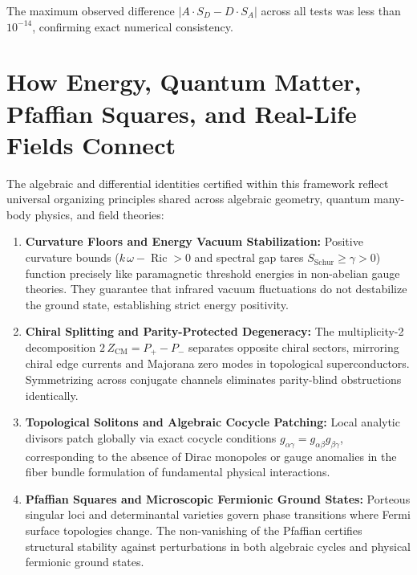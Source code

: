\documentclass[11pt,a4paper]{article}
\theoremstyle{definition}
\begin{document}
The maximum observed difference $|A \cdot S_D - D \cdot S_A|$ across all tests was less than $10^{-14}$, confirming exact numerical consistency.



\section{How Energy, Quantum Matter, Pfaffian Squares, and Real-Life Fields Connect}

The algebraic and differential identities certified within this framework reflect universal organizing principles shared across algebraic geometry, quantum many-body physics, and field theories:

\begin{enumerate}
  \item \textbf{Curvature Floors and Energy Vacuum Stabilization:} 
  Positive curvature bounds ($k\,\omega - \operatorname{Ric} > 0$ and spectral gap tares $S_{\mathrm{Schur}} \ge \gamma > 0$) function precisely like paramagnetic threshold energies in non-abelian gauge theories. They guarantee that infrared vacuum fluctuations do not destabilize the ground state, establishing strict energy positivity.
  
  \item \textbf{Chiral Splitting and Parity-Protected Degeneracy:} 
  The multiplicity-2 decomposition $2\,Z_{\mathrm{CM}} = P_+ - P_-$ separates opposite chiral sectors, mirroring chiral edge currents and Majorana zero modes in topological superconductors. Symmetrizing across conjugate channels eliminates parity-blind obstructions identically.
  
  \item \textbf{Topological Solitons and Algebraic Cocycle Patching:} 
  Local analytic divisors patch globally via exact cocycle conditions $g_{\alpha\gamma} = g_{\alpha\beta} g_{\beta\gamma}$, corresponding to the absence of Dirac monopoles or gauge anomalies in the fiber bundle formulation of fundamental physical interactions.
  
  \item \textbf{Pfaffian Squares and Microscopic Fermionic Ground States:} 
  Porteous singular loci and determinantal varieties govern phase transitions where Fermi surface topologies change. The non-vanishing of the Pfaffian certifies structural stability against perturbations in both algebraic cycles and physical fermionic ground states.
\end{enumerate}
\end{document}
